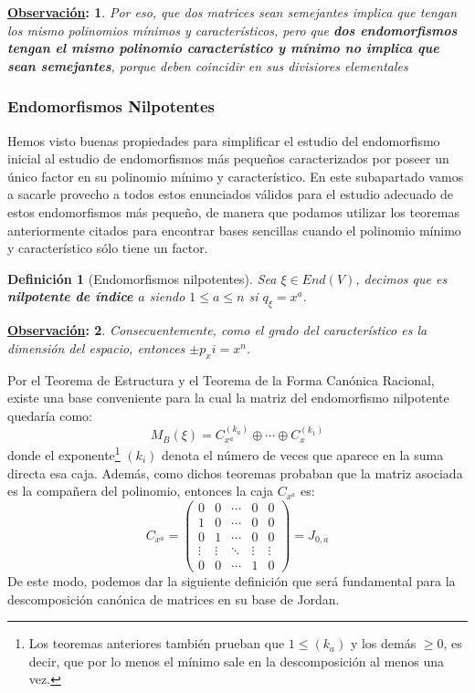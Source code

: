 \documentclass[10pt,a4paper,openright]{book}
\theoremstyle{break}
\newtheorem*{defi}{Definición}
\newtheorem*{obs}{\underline{Observación}:}
\begin{document}
\begin{obs}
Por eso, que dos matrices sean semejantes implica que tengan los mismo polinomios mínimos y característicos, pero que \textbf{dos endomorfismos tengan el mismo polinomio característico y mínimo no implica que sean semejantes}, porque deben coincidir en sus divisiores elementales
\end{obs}

\subsubsection{Endomorfismos Nilpotentes}
\label{Nilpotentes}
Hemos visto buenas propiedades para simplificar el estudio del endomorfismo inicial al estudio de endomorfismos más pequeños caracterizados por poseer un único factor en su polinomio mínimo y característico. En este subapartado vamos a sacarle provecho a todos estos enunciados válidos para el estudio adecuado de estos endomorfismos más pequeño, de manera que podamos utilizar los teoremas anteriormente citados para encontrar bases sencillas cuando el polinomio mínimo y característico sólo tiene un factor.

\begin{defi}[Endomorfismos nilpotentes]
Sea $\xi \in End(V)$, decimos que es \textbf{nilpotente de índice $a$} siendo $1\leq a \leq n$ si $q_\xi = x^a$.
\end{defi}

\begin{obs}
Consecuentemente, como el grado del característico es la dimensión del espacio, entonces $\pm p_xi = x^n$.
\end{obs}

Por el Teorema de Estructura y el Teorema de la Forma Canónica Racional, existe una base conveniente para la cual la matriz del endomorfismo nilpotente quedaría como:
$$M_B(\xi) = C_{x^a}^{(k_a)}\oplus \cdots \oplus C_{x}^{(k_1)}$$
donde el exponente\footnote{Los teoremas anteriores también prueban que $1\leq (k_a)$ y los demás $\geq 0$, es decir, que por lo menos el mínimo sale en la descomposición al menos una vez.} $(k_i)$ denota el número de veces que aparece en la suma directa esa caja. Además, como dichos teoremas probaban que la matriz asociada es la compañera del polinomio, entonces la caja $C_{x^a}$ es: 
$$C_{x^{a}}=\begin{pmatrix}
0&0&\cdots &0 &0\\
1&0&\cdots &0 &0\\
0&1&\cdots &0 &0\\
\vdots & \vdots& \ddots & \vdots & \vdots \\
0&0&\cdots & 1&0
\end{pmatrix}=J_{0,a}$$
De este modo, podemos dar la siguiente definición que será fundamental para la descomposición canónica de matrices en su base de Jordan.
\end{document}
